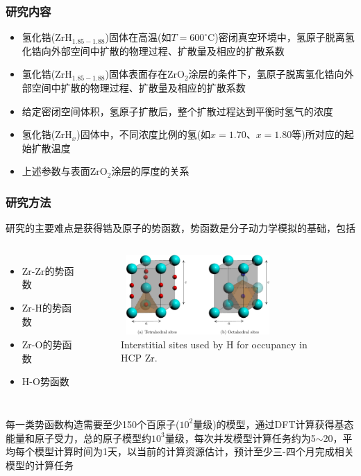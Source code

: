 \begin{frame}
	\frametitle{研究内容}
	\begin{itemize}
	\item 氢化锆($\mathrm{ZrH}_{1.85-1.88}$)固体在高温(如$T=600^{\circ}\mathrm{C}$)密闭真空环境中，氢原子脱离氢化锆向外部空间中扩散的物理过程、扩散量及相应的扩散系数
	\item 氢化锆($\mathrm{ZrH}_{1.85-1.88}$)固体表面存在$\mathrm{ZrO}_2$涂层的条件下，氢原子脱离氢化锆向外部空间中扩散的物理过程、扩散量及相应的扩散系数
	\item 给定密闭空间体积，氢原子扩散后，整个扩散过程达到平衡时氢气的浓度
	\item 氢化锆($\mathrm{ZrH}_x$)固体中，不同浓度比例的氢(如$x=1.70$、$x=1.80$等)所对应的起始扩散温度
	\item 上述参数与表面$\mathrm{ZrO}_2$涂层的厚度的关系
	\end{itemize}
\end{frame}

\begin{frame}
	\frametitle{研究方法}
研究的主要难点是获得锆及原子的势函数，势函数是分子动力学模拟的基础，包括
  \begin{columns}
\begin{itemize}
	\item $\mathrm{Zr}$-$\mathrm{Zr}$的势函数
	\item $\mathrm{Zr}$-$\mathrm{H}$的势函数
	\item $\mathrm{Zr}$-$\mathrm{O}$的势函数
	\item $\mathrm{H}$-$\mathrm{O}$势函数
\end{itemize}
\begin{figure}[!ht]
\centering
\vspace*{-0.05in}
\includegraphics[height=1.20in,width=2.30in,viewport=0 0 1316 735,clip]{Figures/Interstitial_sites-used-by-H-for-occupancy-in-hcp_Zr.png}
\caption{\tiny \textrm{Interstitial sites used by H for occupancy in HCP Zr.}}
\label{Fig:Interstitial_sites-used-by-H-for-occupancy-in-hcp_Zr}
\end{figure}
  \end{columns}
每一类势函数构造需要至少\textrm{150}个百原子($10^2$量级)的模型，通过\textrm{DFT}计算获得基态能量和原子受力，总的原子模型约$10^3$量级，每次并发模型计算任务约为\textrm{5$\sim$20}，平均每个模型计算时间为1天，以当前的计算资源估计，预计至少三-四个月完成相关模型的计算任务
\end{frame}

